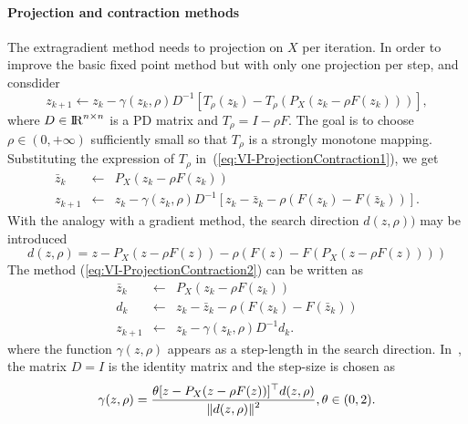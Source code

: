 \paragraph{Projection and contraction methods} The extragradient method needs to projection on $X$ per iteration. In order to improve the basic fixed point method but with only one projection per step, \citet{Solodov.Tseng1996} and \citet{He_AMO1997} consdider
\begin{equation}
  \label{eq:VI-ProjectionContraction1}
  z_{k+1}\leftarrow z_k- \gamma(z_k,\rho) D^{-1}\left[T_{\rho}(z_k)-T_{\rho}(P_X(z_k-\rho F(z_k)) )\right],
\end{equation}
where $D\in \mathrm{I\!R}^{n\times n}$ is a PD matrix and  $T_\rho=I-\rho F$. The goal is to choose $\rho \in (0,+\infty)$ sufficiently small so that $T_\rho$ is a strongly monotone mapping. Substituting the expression of $T_\rho$ in~(\ref{eq:VI-ProjectionContraction1}), we get
\begin{equation}
  \label{eq:VI-ProjectionContraction2}
  \begin{array}{lcl}
    \bar z_{k} &\leftarrow& P_X(z_k-\rho F(z_k))\\
    z_{k+1} &\leftarrow& z_k - \gamma(z_k,\rho) D^{-1}\left[z_k-\bar z_k - \rho( F(z_k)- F(\bar z_k))\right].
  \end{array}
\end{equation}
With the analogy with a gradient method,  the search direction $d(z,\rho))$ may be introduced
\begin{equation}
  \label{eq:VI-projectionContraction3}
    d(z,\rho) = z- P_X(z-\rho F(z))  - \rho (F(z) - F(P_X(z-\rho F(z)))) 
  \end{equation}
The method (\ref{eq:VI-ProjectionContraction2}) can be written as 
\begin{equation}
  \label{eq:VI-projectionContraction4}
  \begin{array}{lcl}
    \bar z_{k} &\leftarrow& P_X(z_k-\rho F(z_k))\\
    d_k  &\leftarrow&  z_k - \bar z_k - \rho (F(z_k) - F(\bar z_k)) \\
    z_{k+1} &\leftarrow & z_k - \gamma(z_k,\rho) D^{-1} d_k.
  \end{array}
\end{equation}
where the function $\gamma(z,\rho)$ appears as a step-length in the search direction.
In~\citep{He_AMO1997}, the matrix $D=I$ is the identity matrix and the step-size is chosen as
\begin{equation}
  \label{eq:VI-projectionContraction5}
  \begin{array}{lcl}
    \gamma (z,\rho) = \Frac{\theta [ z - P_X(z-\rho F(z)) ]^\top d(z,\rho)}{\|d(z,\rho)\|^2}, \theta \in (0,2).
  \end{array}
\end{equation}
